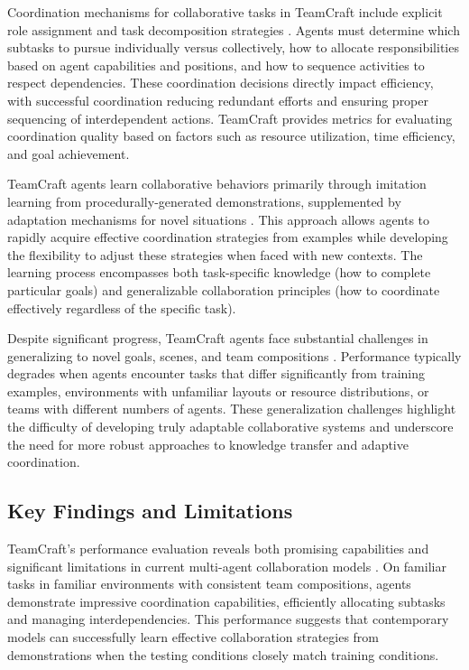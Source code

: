 \documentclass[a4paper, 12pt]{article}
\begin{document}
Coordination mechanisms for collaborative tasks in TeamCraft include explicit role assignment and task decomposition strategies \autocite{long2024teamcraftbenchmarkmultimodalmultiagent}. Agents must determine which subtasks to pursue individually versus collectively, how to allocate responsibilities based on agent capabilities and positions, and how to sequence activities to respect dependencies. These coordination decisions directly impact efficiency, with successful coordination reducing redundant efforts and ensuring proper sequencing of interdependent actions. TeamCraft provides metrics for evaluating coordination quality based on factors such as resource utilization, time efficiency, and goal achievement.

TeamCraft agents learn collaborative behaviors primarily through imitation learning from procedurally-generated demonstrations, supplemented by adaptation mechanisms for novel situations \autocite{long2024teamcraftbenchmarkmultimodalmultiagent}. This approach allows agents to rapidly acquire effective coordination strategies from examples while developing the flexibility to adjust these strategies when faced with new contexts. The learning process encompasses both task-specific knowledge (how to complete particular goals) and generalizable collaboration principles (how to coordinate effectively regardless of the specific task).

Despite significant progress, TeamCraft agents face substantial challenges in generalizing to novel goals, scenes, and team compositions \autocite{long2024teamcraftbenchmarkmultimodalmultiagent}. Performance typically degrades when agents encounter tasks that differ significantly from training examples, environments with unfamiliar layouts or resource distributions, or teams with different numbers of agents. These generalization challenges highlight the difficulty of developing truly adaptable collaborative systems and underscore the need for more robust approaches to knowledge transfer and adaptive coordination.

\subsection{Key Findings and Limitations}

TeamCraft's performance evaluation reveals both promising capabilities and significant limitations in current multi-agent collaboration models \autocite{long2024teamcraftbenchmarkmultimodalmultiagent}. On familiar tasks in familiar environments with consistent team compositions, agents demonstrate impressive coordination capabilities, efficiently allocating subtasks and managing interdependencies. This performance suggests that contemporary models can successfully learn effective collaboration strategies from demonstrations when the testing conditions closely match training conditions.
\end{document}
